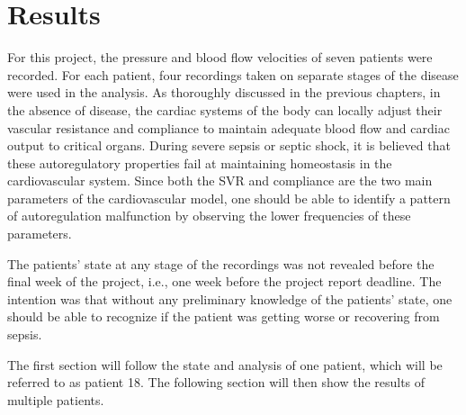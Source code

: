 
\chapter{Results}

For this project, the pressure and blood flow velocities of seven patients were recorded. For each patient, four recordings taken on separate stages of the disease were used in the analysis. As thoroughly discussed in the previous chapters, in the absence of disease, the cardiac systems of the body can locally adjust their vascular resistance and compliance to maintain adequate blood flow and cardiac output to critical organs. During severe sepsis or septic shock, it is believed that these autoregulatory properties fail at maintaining homeostasis in the cardiovascular system. Since both the SVR and compliance are the two main parameters of the cardiovascular model, one should be able to identify a pattern of autoregulation malfunction by observing the lower frequencies of these parameters.

The patients' state at any stage of the recordings was not revealed before the final week of the project, i.e., one week before the project report deadline. The intention was that without any preliminary knowledge of the patients' state, one should be able to recognize if the patient was getting worse or recovering from sepsis. 

The first section will follow the state and analysis of one patient, which will be referred to as patient 18. The following section will then show the results of multiple patients.




